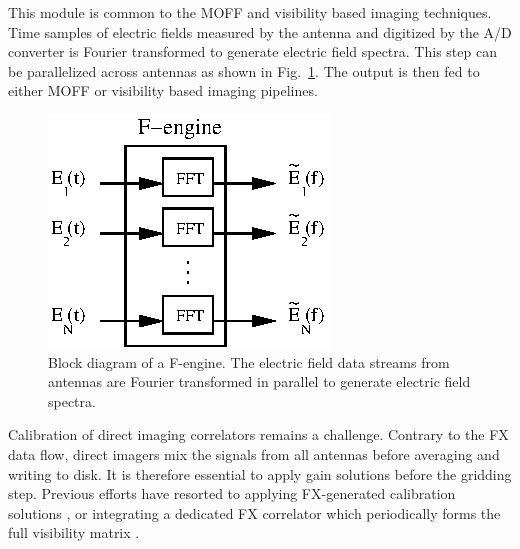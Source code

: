 \documentclass[a4paper,fleqn,usenatbib]{mnras}
\begin{document}
\par\medskip
{}
\par\medskip
\noindent This module is common to the MOFF and visibility based imaging 
techniques. Time samples of electric fields measured by the antenna and 
digitized by the A/D converter is Fourier transformed to generate electric 
field spectra. This step can be parallelized across antennas as shown in 
Fig.~\ref{fig:f-engine}. The output is then fed to either MOFF or visibility 
based imaging pipelines.

\begin{figure}
  \includegraphics[width=\columnwidth]{F-engine}
  \caption{Block diagram of a F-engine. The electric field data streams from
    antennas are Fourier transformed in parallel to generate electric field
    spectra.}
  \label{fig:f-engine}
\end{figure}

\par\medskip
{}
\par\medskip
\noindent Calibration of direct imaging correlators remains a challenge. Contrary
to the FX data flow, direct imagers mix the signals from all antennas before
averaging and writing to disk. It is therefore essential to apply gain solutions 
before the gridding step. Previous efforts have resorted to applying FX-generated
calibration solutions \citep{zhe14,fos14}, or integrating a dedicated FX 
correlator which periodically forms the full visibility matrix 
\citep{wij09,dev09}. 
\end{document}
